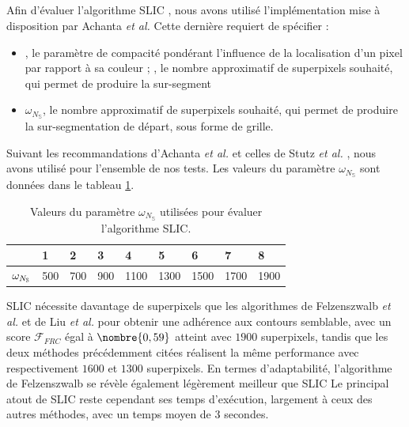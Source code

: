  \subsection{}
\label{subsec:sp:res-slic}
 
 Afin d'évaluer l'algorithme SLIC \cite{achanta2012slic}, nous avons utilisé l'implémentation mise à disposition par Achanta \textit{et al.} Cette dernière requiert de spécifier : 
 \begin{itemize}
 \item {}, le paramètre de compacité pondérant l'influence de la localisation d'un pixel par rapport à sa couleur ; , le nombre approximatif de superpixels souhaité, qui permet de produire la sur-segment
 \item $\omega_{N_{\mathbb{S}}}$, le nombre approximatif de superpixels souhaité, qui permet de produire la sur-segmentation de départ, sous forme de grille.
 \end{itemize}
 
Suivant les recommandations d'Achanta \textit{et al.} \cite{achanta2012slic} et celles de Stutz \textit{et al.} \cite{stutz2015superpixel}, nous avons utilisé  pour l'ensemble de nos tests. Les valeurs du paramètre  $\omega_{N_{\mathbb{S}}}$ sont données dans le tableau \ref{tab:sp:paramSLIC}.

 \begin{table}[htb]
 \caption{Valeurs du paramètre $\omega_{N_{\mathbb{S}}}$ utilisées pour évaluer l'algorithme SLIC.}
\centering
\begin{tabular}{| l| l| l| l| l| l| l| l|  l|}
\hline
\cellcolor{gris}{Test} & 1 & 2 & 3 & 4 & 5 & 6&7 &8\\
\hline
$\cellcolor{gris}{\omega_{N_{\mathbb{S}}}}$ & 500 & 700 & 900 &1100 &1300 &1500&1700 &1900\\
\hline
\end{tabular}
\label{tab:sp:paramSLIC}
\end{table}


 SLIC nécessite davantage de superpixels que les algorithmes de Felzenszwalb \textit{et al.} \cite{felzenszwalb2004efficient} et de Liu \textit{et al.} \cite{liu2011entropy} pour obtenir une adhérence aux contours semblable, avec un score $\mathcal{F}_{FRC}$ égal à $\nombre{0,59}$ atteint avec  $1900$ superpixels, tandis que les deux méthodes précédemment citées réalisent la même performance avec respectivement $1600$ et $1300$ superpixels. En termes d'adaptabilité, l'algorithme de Felzenszwalb se révèle également légèrement meilleur que SLIC  Le principal atout de SLIC reste cependant ses temps d'exécution, largement  à ceux des autres méthodes, avec un temps moyen de $3$ secondes.


